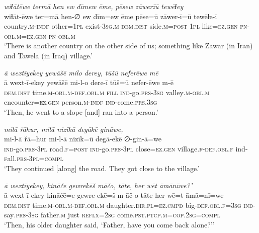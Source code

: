 \ea \label{ŽH.6}
\textit{wiɫātēwe termā hen ew dīmew ēme, pēsew zāwerīū tewēɫey} \\ 
\gll wiɫāt-ēwe ter=mā hen-∅ ew dīm=ew ēme pēse=ū zāwer-ī=ū tewēɫe-ī \\ 
 country\textsc{.m}\textsc{-indf} other\textsc{=1pl} exist\textsc{-3sg}\textsc{.m} \textsc{dem.dist} side\textsc{.m}\textsc{=\textsc{post}} \textsc{1pl} like\textsc{=ez}\textsc{.gen} \textsc{pn}\textsc{-obl}\textsc{.m}\textsc{=ez}\textsc{.gen} \textsc{pn}\textsc{-obl}\textsc{.m} \\ 
\glt `There is another country on the other side of us; something like Zawar (in Iran) and Tawela (in Iraq) village.'
\z 
 
\ea \label{ŽH.8}
\textit{ā wextīyekey yewāšē milo derey, tūšū neferēwe mē} \\ 
\gll ā wext-ī-ekey yewāšē mi-l-o dere-ī tūš=ū nefer-ēwe m-ē \\ 
 \textsc{dem.dist} time\textsc{.m}\textsc{-obl}\textsc{.m}\textsc{-def}\textsc{.obl}\textsc{.m} \textsc{fill} \textsc{ind-}go\textsc{.prs}\textsc{-3sg} valley\textsc{.m}\textsc{-obl}\textsc{.m} encounter\textsc{=ez}\textsc{.gen} person\textsc{.m}\textsc{-indf} \textsc{ind-}come\textsc{.prs}\textsc{.3sg} \\ 
\glt `Then, he went to a slope [and] ran into a person.'
\z 
 
\ea \label{ŽH.15}
\textit{milā řāhur, milā nizīkū degākē gināwe,} \\ 
\gll mi-l-ā řā=hur mi-l-ā nizīk=ū degā-ekē ∅-gin-ā=we \\ 
 \textsc{ind-}go\textsc{.prs}\textsc{-3pl} road\textsc{\textsc{.f}}\textsc{=\textsc{post}} \textsc{ind-}go\textsc{.prs}\textsc{-3pl} close\textsc{=ez}\textsc{.gen} village\textsc{\textsc{.f}}\textsc{-def}\textsc{.obl}\textsc{\textsc{.f}} ind\textsc{-f}all\textsc{.prs}\textsc{-3pl}\textsc{=compl} \\ 
\glt `They continued [along] the road. They got close to the village.'
\z 
 
\ea \label{ŽH.22}
\textit{ā wextīyekey, kināče gewrekēš māčo, tāte, her wēt āmānīwe?’} \\ 
\gll ā wext-ī-ekey kināčē=e gewre-ekē=š m-āč-o tāte her wē=t āmā=nī=we \\ 
 \textsc{dem.dist} time\textsc{.m}\textsc{-obl}\textsc{.m}\textsc{-def}\textsc{.obl}\textsc{.m} daughter\textsc{.dir}\textsc{.pl}\textsc{=ez}\textsc{.cmpd} big\textsc{-def}\textsc{.obl}\textsc{\textsc{.f}}\textsc{=3sg} \textsc{ind-}say\textsc{.prs}\textsc{-3sg} father\textsc{.m} just \textsc{reflx}\textsc{=\textsc{2sg}} come\textsc{.pst}\textsc{.ptcp}\textsc{.m}\textsc{=cop}\textsc{.\textsc{2sg}}\textsc{=compl} \\ 
\glt `Then, his older daughter said, ‘Father, have you come back alone?’'
\z 
 

